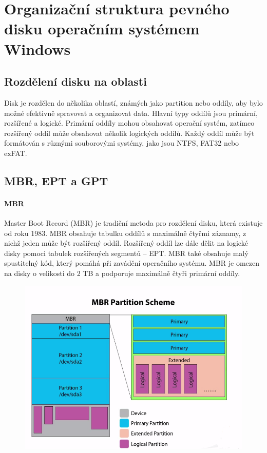 \section{Organizační struktura pevného disku operačním systémem Windows}
\subsection{Rozdělení disku na oblasti}
Disk je rozdělen do několika oblastí, známých jako partition nebo oddíly, aby bylo možné efektivně spravovat a organizovat data. Hlavní typy oddílů jsou primární, rozšířené a logické. Primární oddíly mohou obsahovat operační systém, zatímco rozšířený oddíl může obsahovat několik logických oddílů. Každý oddíl může být formátován s různými souborovými systémy, jako jsou NTFS, FAT32 nebo exFAT.

\subsection{MBR, EPT a GPT}
\paragraph{MBR}
Master Boot Record (MBR) je tradiční metoda pro rozdělení disku, která existuje od roku 1983. MBR obsahuje tabulku oddílů s maximálně čtyřmi záznamy, z nichž jeden může být rozšířený oddíl. Rozšířený oddíl lze dále dělit na logické disky pomoci tabulek rozšířených 
segmentů – EPT. MBR také obsahuje malý spustitelný kód, který pomáhá při zavádění operačního systému. MBR je omezen na disky o velikosti do 2 TB a podporuje maximálně čtyři primární oddíly.

\begin{figure}[h]
\centering
\includegraphics[scale=0.3]{sections/14_org_struk_pev_disk_op_sys_win/images/2-2128175945.png}
\end{figure}


